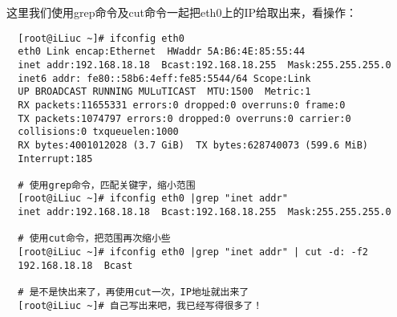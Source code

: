 这里我们使用grep命令及cut命令一起把eth0上的IP给取出来，看操作：

\begin{verbatim}
  [root@iLiuc ~]# ifconfig eth0
  eth0 Link encap:Ethernet  HWaddr 5A:B6:4E:85:55:44  
  inet addr:192.168.18.18  Bcast:192.168.18.255  Mask:255.255.255.0
  inet6 addr: fe80::58b6:4eff:fe85:5544/64 Scope:Link
  UP BROADCAST RUNNING MULuTICAST  MTU:1500  Metric:1
  RX packets:11655331 errors:0 dropped:0 overruns:0 frame:0
  TX packets:1074797 errors:0 dropped:0 overruns:0 carrier:0
  collisions:0 txqueuelen:1000 
  RX bytes:4001012028 (3.7 GiB)  TX bytes:628740073 (599.6 MiB)
  Interrupt:185

  # 使用grep命令，匹配关键字，缩小范围
  [root@iLiuc ~]# ifconfig eth0 |grep "inet addr"
  inet addr:192.168.18.18  Bcast:192.168.18.255  Mask:255.255.255.0

  # 使用cut命令，把范围再次缩小些
  [root@iLiuc ~]# ifconfig eth0 |grep "inet addr" | cut -d: -f2
  192.168.18.18  Bcast

  # 是不是快出来了，再使用cut一次，IP地址就出来了
  [root@iLiuc ~]# 自己写出来吧，我已经写得很多了！
\end{verbatim}
